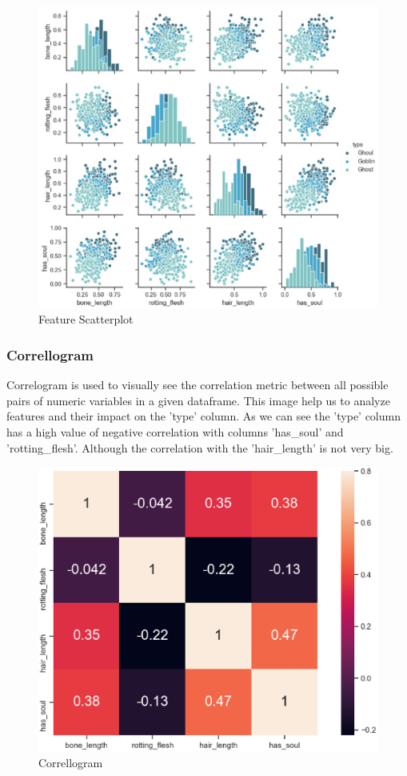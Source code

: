 \begin{figure}[h]\centering
	\includegraphics[scale=0.3]{figures/pairplot.eps}
	\caption{Feature Scatterplot}
\end{figure}


\subsubsection{Correllogram}
Correlogram is used to visually see the correlation metric between all possible pairs of numeric variables in a given dataframe. This image help us to analyze features and their impact on the 'type' column. As we can see the 'type' column has a high value of negative correlation with columns 'has_soul' and 'rotting_flesh'. Although the correlation with the 'hair_length' is not very big.


\begin{figure}[h]\centering
	\includegraphics[scale=0.3]{figures/corr.eps}
	\caption{Correllogram}
\end{figure}


